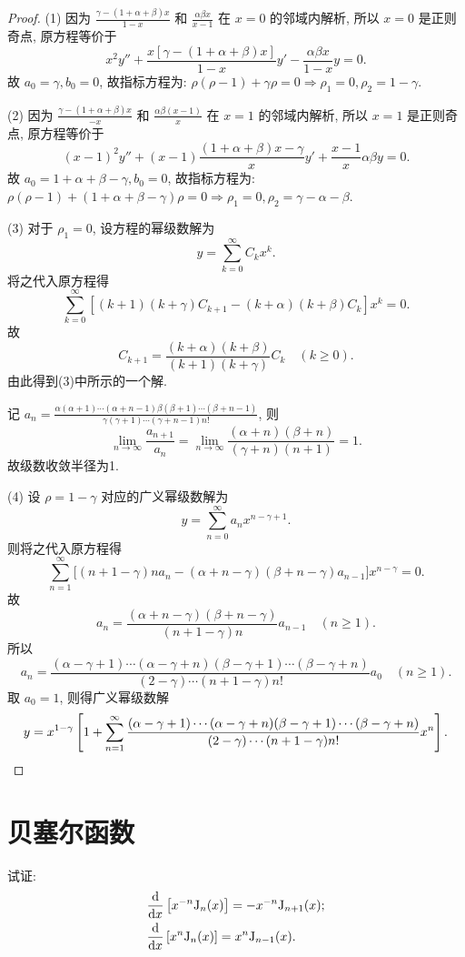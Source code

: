 \begin{proof}
  (1) 因为 $\frac{\gamma-(1+\alpha+\beta)x}{1-x}$
  和 $\frac{\alpha\beta x}{x-1}$ 在 $x=0$ 的邻域内解析, 所以 $x=0$ 是正则奇点, 原方程等价于
  \[x^2y''+\frac{x[\gamma-(1+\alpha+\beta)x]}{1-x}y'-\frac{\alpha\beta x}{1-x}y=0.\]
  故 $a_0=\gamma,b_0=0$, 故指标方程为: $\rho(\rho-1)+\gamma\rho=0\Rightarrow\rho_1=0,\rho_2=1-\gamma$.

  (2) 因为 $\frac{\gamma-(1+\alpha+\beta)x}{-x}$
  和 $\frac{\alpha\beta(x-1)}{x}$ 在 $x=1$ 的邻域内解析, 所以 $x=1$ 是正则奇点, 原方程等价于
  \[(x-1)^2y''+(x-1)\frac{(1+\alpha+\beta)x-\gamma}{x}y'+\frac{x-1}{x}\alpha\beta y=0.\]
  故 $a_0=1+\alpha+\beta-\gamma,b_0=0$, 
  故指标方程为: $\rho(\rho-1)+(1+\alpha+\beta-\gamma)\rho=0\Rightarrow\rho_1=0,\rho_2=\gamma-\alpha-\beta$.

  (3) 对于 $\rho_1=0$, 设方程的幂级数解为
  \[y=\sum_{k=0}^{\infty}C_kx^k.\]
  将之代入原方程得
  \[\sum_{k=0}^{\infty}\left[(k+1)(k+\gamma)C_{k+1}-(k+\alpha)(k+\beta)C_k\right]x^k=0.\]
  故
  \[C_{k+1}=\frac{(k+\alpha)(k+\beta)}{(k+1)(k+\gamma)}C_k\quad (k\geq 0).\]
  由此得到(3)中所示的一个解.

  记 $a_n=\frac{\alpha(\alpha+1)\cdots(\alpha+n-1)\beta(\beta+1)\cdots(\beta+n-1)}{\gamma(\gamma+1)\cdots(\gamma+n-1)n!}$, 则
  \[\lim_{n\to\infty}\frac{a_{n+1}}{a_n}=\lim_{n\to\infty}\frac{(\alpha+n)(\beta+n)}{(\gamma+n)(n+1)}=1.\]
  故级数收敛半径为1.

  (4) 设 $\rho=1-\gamma$ 对应的广义幂级数解为
  \[y=\sum_{n=0}^{\infty}a_nx^{n-\gamma+1}.\]
  则将之代入原方程得
  \[\sum_{n=1}^{\infty}\big[(n+1-\gamma)na_n-(\alpha+n-\gamma)(\beta+n-\gamma)a_{n-1}\big]x^{n-\gamma}=0.\]
  故
  \[a_n=\frac{(\alpha+n-\gamma)(\beta+n-\gamma)}{(n+1-\gamma)n}a_{n-1}\quad (n\geq 1).\]
  所以
  \[a_n=\frac{(\alpha-\gamma+1)\cdots(\alpha-\gamma+n)(\beta-\gamma+1)
    \cdots(\beta-\gamma+n)}{(2-\gamma)\cdots(n+1-\gamma)n!}a_0\quad (n\geq 1).\]
  取 $a_0=1$, 则得广义幂级数解
  \[y=x^{1-\gamma}\left[1+\sum_{n=1}^{\infty}\frac{(\alpha-\gamma+1)\cdots(\alpha-\gamma+n)(\beta-\gamma+1)\cdots(\beta-\gamma+n)}{(2-\gamma)\cdots(n+1-\gamma)n!}x^n\right].\qedhere\]
\end{proof}



\section{贝塞尔函数}



\begin{exercise}
  试证:
  \begin{align*}
    & \frac{\mathop{}\!\mathrm{d}}{\mathop{}\!\mathrm{d} x}\left[x^{-n}\mathrm{J}_n(x)\right]=-x^{-n}\mathrm{J}_{n+1}(x); \\
    & \frac{\mathop{}\!\mathrm{d}}{\mathop{}\!\mathrm{d} x}\left[x^n\mathrm{J}_n(x)\right]=x^n\mathrm{J}_{n-1}(x).
  \end{align*}
\end{exercise}

